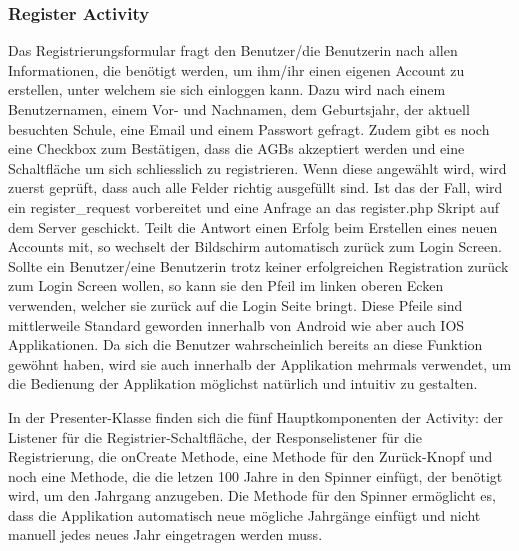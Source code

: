 \documentclass[a4paper,11pt]{report}
\begin{document}
				\subsubsection{Register Activity} \label{register:act}
				Das Registrierungsformular fragt den Benutzer/die Benutzerin nach allen Informationen, die benötigt werden, um ihm/ihr einen eigenen Account zu erstellen, unter welchem sie sich einloggen kann. Dazu wird nach einem Benutzernamen, einem Vor- und Nachnamen, dem Geburtsjahr, der aktuell besuchten Schule, eine Email und einem Passwort gefragt. Zudem gibt es noch eine Checkbox zum Bestätigen, dass die AGBs akzeptiert werden und eine Schaltfläche um sich schliesslich zu registrieren. Wenn diese angewählt wird, wird zuerst geprüft, dass auch alle Felder richtig ausgefüllt sind. Ist das der Fall, wird ein register\_request vorbereitet und eine Anfrage an das register.php Skript auf dem Server geschickt. Teilt die Antwort einen Erfolg beim Erstellen eines neuen Accounts mit, so wechselt der Bildschirm automatisch zurück zum Login Screen. Sollte ein Benutzer/eine Benutzerin trotz keiner erfolgreichen Registration zurück zum Login Screen wollen, so kann sie den Pfeil im linken oberen Ecken verwenden, welcher sie zurück auf die Login Seite bringt. Diese Pfeile sind mittlerweile Standard geworden innerhalb von Android wie aber auch IOS Applikationen. Da sich die Benutzer wahrscheinlich bereits an diese Funktion gewöhnt haben, wird sie auch innerhalb der Applikation mehrmals verwendet, um die Bedienung der Applikation möglichst natürlich und intuitiv zu gestalten.
				
				In der Presenter-Klasse finden sich die fünf Hauptkomponenten der Activity: der Listener für die Registrier-Schaltfläche, der Responselistener für die Registrierung, die onCreate Methode, eine Methode für den Zurück-Knopf und noch eine Methode, die die letzen 100 Jahre in den Spinner einfügt, der benötigt wird, um den Jahrgang anzugeben. Die Methode für den Spinner ermöglicht es, dass die Applikation automatisch neue mögliche Jahrgänge einfügt und nicht manuell jedes neues Jahr eingetragen werden muss.
				
\end{document}
